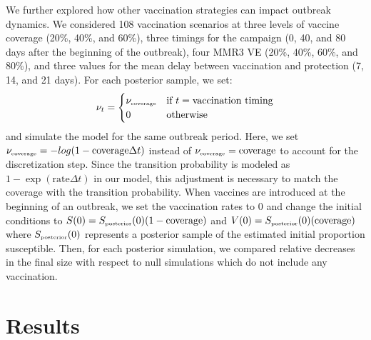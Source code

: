 \documentclass[12pt]{article}
\newcommand{\tsub}[2]{#1_{{\textrm{\tiny #2}}}}
\begin{document}
We further explored how other vaccination strategies can impact outbreak dynamics.
We considered 108 vaccination scenarios at three levels of vaccine coverage (20\%, 40\%, and 60\%), three timings for the campaign (0, 40, and 80 days after the beginning of the outbreak), four MMR3 VE (20\%, 40\%, 60\%, and 80\%), and three values for the mean delay between vaccination and protection (7, 14, and 21 days).
For each posterior sample, we set:
\begin{equation}
\nu_t = \begin{cases}
\tsub{\nu}{coverage} & \textrm{if } t = \textrm{vaccination timing}\\
0 & \textrm{otherwise}
\end{cases}
\end{equation}
and simulate the model for the same outbreak period.
Here, we set $\tsub{\nu}{coverage} = -log(1-\textrm{coverage} \Delta t)$ instead of $\tsub{\nu}{coverage} = \textrm{coverage}$ to account for the discretization step.
Since the transition probability is modeled as $1-\exp(\mathrm{rate} \Delta t)$ in our model, this adjustment is necessary to match the coverage with the transition probability.
When vaccines are introduced at the beginning of an outbreak, we set the vaccination rates to 0 and change the initial conditions to $S(0) = \tsub{S}{posterior}(0) (1 - \textrm{coverage})$ and $V(0) = \tsub{S}{posterior}(0) (\textrm{coverage})$ where $\tsub{S}{posterior}(0)$ represents a posterior sample of the estimated initial proportion susceptible.
Then, for each posterior simulation, we compared relative decreases in the final size with respect to null simulations which do not include any vaccination.

\section{Results}
\end{document}
